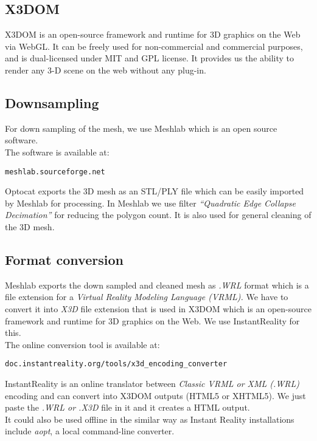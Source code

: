 \documentclass[twoside,12pt,a4paper]{article}
\begin{document}
\subsection{X3DOM}
\label{sub:X3Dom}
X3DOM is an open-source framework and runtime for 3D graphics on the Web via WebGL. It can be freely used for non-commercial and commercial purposes, and is dual-licensed under MIT and GPL license. It provides us the ability to render any 3-D scene on the web without any plug-in.

\subsection{Downsampling} %
\label{sub:downsampling}
For down sampling of the mesh, we use Meshlab which is an open source software.\\
The software is available at:
\begin{lstlisting} 	 
meshlab.sourceforge.net
\end{lstlisting}
Optocat exports the 3D mesh as an STL/PLY file which can be easily imported by Meshlab for processing. In Meshlab we use filter \textit{“Quadratic Edge Collapse Decimation”} for reducing the polygon count. It is also used for general cleaning of the 3D mesh.


\subsection{Format conversion} %
\label{sub:Format Conversion}
Meshlab exports the down sampled and cleaned mesh as \textit{.WRL}  format which is a file extension for a \textit{Virtual Reality Modeling Language (VRML).} We have to convert it into \textit{X3D} file extension that is used in X3DOM which is an open-source framework and runtime for 3D graphics on the Web. We use InstantReality for this.\\
The online conversion tool is available at: 
\begin{lstlisting} 	 
doc.instantreality.org/tools/x3d_encoding_converter
\end{lstlisting}
InstantReality is an online translator between \textit{Classic VRML or XML (.WRL)} encoding and can convert into X3DOM outputs (HTML5 or XHTML5).   We just paste the \textit{.WRL or .X3D} file in it and it creates a HTML output. \\
It could also be used offline in the similar way as Instant Reality installations include \textit{aopt}, a local command-line converter.

\end{document}
